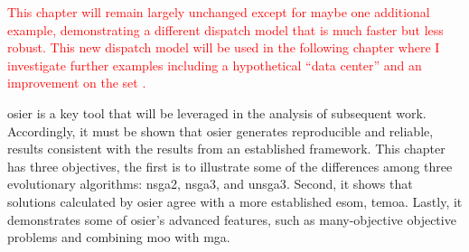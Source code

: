 \textcolor{red}{This chapter will remain largely unchanged except for maybe one
additional example, demonstrating a different dispatch model that is much faster
but less robust. This new dispatch model will be used in the following chapter
where I investigate further examples including a hypothetical ``data center''
and an improvement on the \acf{set} \cite{wigeland_nuclear_2014}.}

\ac{osier} is a key tool that will be leveraged in the analysis of subsequent
work. Accordingly, it must be shown that \ac{osier} generates reproducible and
reliable, results consistent with the results from an established framework.
This chapter has three objectives, the first is to illustrate some of the
differences among three evolutionary algorithms: \ac{nsga2}, \ac{nsga3}, and
\ac{unsga3}. Second, it shows that solutions calculated by \ac{osier} agree with
a more established \ac{esom}, \ac{temoa}. Lastly, it demonstrates some of
\ac{osier}'s advanced features, such as many-objective objective problems and
combining \ac{moo} with \ac{mga}.






